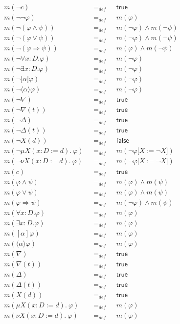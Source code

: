 \documentclass{article}
\begin{document}
\begin{equation*}
\begin{array}{lll}
m(\lnot c) & =_{def} & \mathsf{true} \\
m(\lnot \lnot \varphi ) & =_{def} & m(\varphi ) \\
m(\lnot (\varphi \wedge \psi )) & =_{def} & m(\lnot \varphi )\wedge m(\lnot
\psi ) \\
m(\lnot (\varphi \vee \psi )) & =_{def} & m(\lnot \varphi )\wedge m(\lnot
\psi ) \\
m(\lnot (\varphi \Rightarrow \psi )) & =_{def} & m(\varphi )\wedge m(\lnot
\psi ) \\
m(\lnot \forall {x{:}D}.\varphi ) & =_{def} & m(\lnot \varphi ) \\
m(\lnot \exists {x{:}D}.\varphi ) & =_{def} & m(\lnot \varphi ) \\
m(\lnot \lbrack \alpha ]\varphi ) & =_{def} & m(\lnot \varphi ) \\
m(\lnot \langle \alpha \rangle \varphi ) & =_{def} & m(\lnot \varphi ) \\
m(\lnot \nabla ) & =_{def} & \mathsf{true} \\
m(\lnot \nabla (t)) & =_{def} & \mathsf{true} \\
m(\lnot \Delta ) & =_{def} & \mathsf{true} \\
m(\lnot \Delta (t)) & =_{def} & \mathsf{true} \\
m(\lnot X(d)) & =_{def} & \mathsf{false} \\
m(\lnot \mu X(x{:}D:=d).~\varphi )~~~ & =_{def}~~~ & m(\lnot \varphi \lbrack
X:=\lnot X]) \\
m(\lnot \nu X(x{:}D:=d).~\varphi )~~~ & =_{def}~~~ & m(\lnot \varphi \lbrack
X:=\lnot X]) \\
m(c) & =_{def} & \mathsf{true} \\
m(\varphi \wedge \psi ) & =_{def} & m(\varphi )\wedge m(\psi ) \\
m(\varphi \vee \psi ) & =_{def} & m(\varphi )\wedge m(\psi ) \\
m(\varphi \Rightarrow \psi ) & =_{def} & m(\lnot \varphi )\wedge m(\psi ) \\
m(\forall {x{:}D}.\varphi ) & =_{def} & m(\varphi ) \\
m(\exists {x{:}D}.\varphi ) & =_{def} & m(\varphi ) \\
m([\alpha ]\varphi ) & =_{def} & m(\varphi ) \\
m(\langle \alpha \rangle \varphi ) & =_{def} & m(\varphi ) \\
m(\nabla ) & =_{def} & \mathsf{true} \\
m(\nabla (t)) & =_{def} & \mathsf{true} \\
m(\Delta ) & =_{def} & \mathsf{true} \\
m(\Delta (t)) & =_{def} & \mathsf{true} \\
m(X(d)) & =_{def} & \mathsf{true} \\
m(\mu X(x{:}D:=d).~\varphi )~~~ & =_{def}~~~ & m(\varphi ) \\
m(\nu X(x{:}D:=d).~\varphi )~~~ & =_{def}~~~ & m(\varphi )%
\end{array}%
\end{equation*}%
\end{document}

